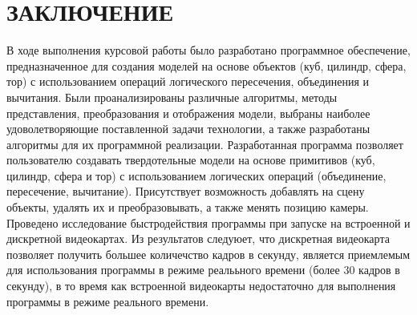 \section*{ЗАКЛЮЧЕНИЕ}
В  ходе  выполнения  курсовой работы  было  разработано  программное обеспечение, предназначенное для создания моделей на основе объектов (куб, цилиндр, сфера, тор) с использованием операций логического пересечения, объединения и 
вычитания.  
Были  проанализированы  различные  алгоритмы,  методы  представления, 
преобразования  и  отображения  модели,  выбраны  наиболее  удоволетворяющие  поставленной  задачи  технологии,  а  также  разработаны  алгоритмы  для  их 
программной реализации. 
Разработанная программа позволяет пользователю создавать твердотельные модели на основе примитивов (куб, цилиндр, сфера и тор) с использованием логических операций (объединение, пересечение, вычитание). 
Присутствует возможность добавлять на сцену объекты, удалять их и преобразовывать, а также менять позицию камеры.
Проведено исследование быстродействия программы при запуске на встроенной и дискретной видеокартах. Из результатов следуюет, что дискретная видеокарта позволяет получить большее количечство кадров в секунду, является приемлемым для использования программы в режиме реалььного времени (более 30 кадров в секунду), в то время как встроенной видеокарты недостаточно для выполнения программы в режиме реального времени.

\pagebreak